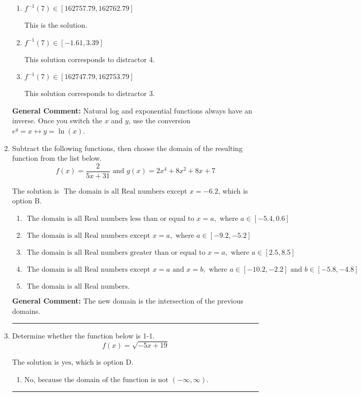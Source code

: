 \documentclass{extbook}[14pt]
\newcommand{\litem}[1]{\item #1

\rule{\textwidth}{0.4pt}}
\begin{document}
\begin{enumerate}
{\begin{enumerate}[label=\Alph*.]
 This solution corresponds to distractor 1.
\item \( f^{-1}(7) \in [162757.79, 162762.79] \)

 This is the solution.
\item \( f^{-1}(7) \in [-1.61, 3.39] \)

 This solution corresponds to distractor 4.
\item \( f^{-1}(7) \in [162747.79, 162753.79] \)

 This solution corresponds to distractor 3.
\end{enumerate}

\textbf{General Comment:} Natural log and exponential functions always have an inverse. Once you switch the $x$ and $y$, use the conversion $ e^y = x \leftrightarrow y=\ln(x)$.
}
\litem{
Subtract the following functions, then choose the domain of the resulting function from the list below.
\[ f(x) = \frac{2}{5x+31} \text{ and } g(x) = 2x^{4} +8 x^{2} +8 x + 7 \]

The solution is \( \text{ The domain is all Real numbers except } x = -6.2 \), which is option B.\begin{enumerate}[label=\Alph*.]
\item \( \text{ The domain is all Real numbers less than or equal to } x = a, \text{ where } a \in [-5.4, 0.6] \)


\item \( \text{ The domain is all Real numbers except } x = a, \text{ where } a \in [-9.2, -5.2] \)


\item \( \text{ The domain is all Real numbers greater than or equal to } x = a, \text{ where } a \in [2.5, 8.5] \)


\item \( \text{ The domain is all Real numbers except } x = a \text{ and } x = b, \text{ where } a \in [-10.2, -2.2] \text{ and } b \in [-5.8, -4.8] \)


\item \( \text{ The domain is all Real numbers. } \)


\end{enumerate}

\textbf{General Comment:} The new domain is the intersection of the previous domains.
}
\litem{
Determine whether the function below is 1-1.
\[ f(x) = \sqrt{-5 x + 19} \]

The solution is \( \text{yes} \), which is option D.\begin{enumerate}[label=\Alph*.]
\item \( \text{No, because the domain of the function is not $(-\infty, \infty)$.} \)


\end{enumerate}}
\end{enumerate}
\end{document}
